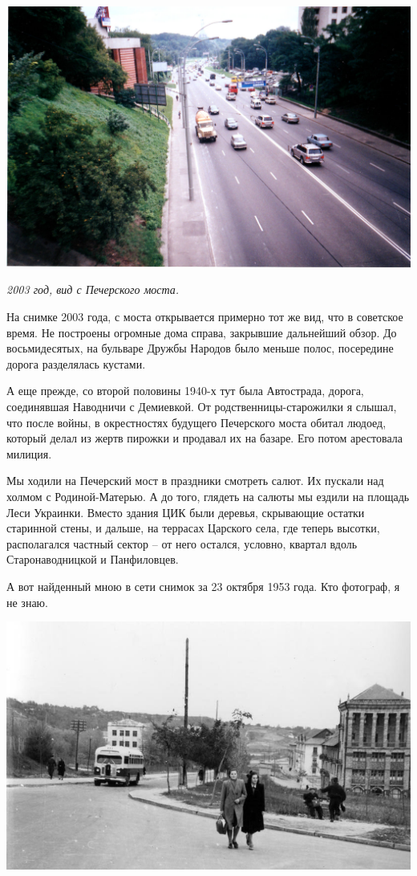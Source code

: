 \begin{center}
\includegraphics[width=\linewidth]{chast-vosp/zver/pech-most.jpg}

\textit{2003 год, вид с Печерского моста.}
\end{center}

На снимке 2003 года, с моста открывается примерно тот же вид, что в советское время. Не построены огромные дома справа, закрывшие дальнейший обзор. До восьмидесятых, на бульваре Дружбы Народов было меньше полос, посередине дорога разделялась кустами.

А еще прежде, со второй половины 1940-х тут была Автострада, дорога, соединявшая Наводничи с Демиевкой. От родственницы-старожилки я слышал, что после войны, в окрестностях будущего Печерского моста обитал людоед, который делал из жертв пирожки и продавал их на базаре. Его потом арестовала милиция.

Мы ходили на Печерский мост в праздники смотреть салют. Их пускали над холмом с Родиной-Матерью. А до того, глядеть на салюты мы ездили на площадь Леси Украинки. Вместо здания ЦИК были деревья, скрывающие остатки старинной стены, и дальше, на террасах Царского села, где теперь высотки, располагался частный сектор – от него остался, условно, квартал вдоль Старонаводницкой и Панфиловцев.

А вот найденный мною в сети снимок за 23 октября 1953 года. Кто фотограф, я не знаю.

\begin{center}
\includegraphics[width=\linewidth]{chast-vosp/zver/1953-oct-23-2.jpg}
\end{center}

